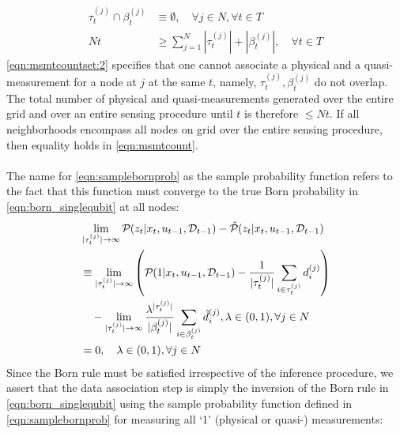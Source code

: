 \begin{align}
\tau^{(j)}_t \cap \beta^{(j)}_t & \equiv \emptyset , \quad\forall j \in N, \forall t \in T \label{eqn:msmtcountset:2} \\
Nt & \geq \sum_{j=1}^{N} |\tau^{(j)}_t| + |\beta^{(j)}_t| , \quad \forall t \in T \label{eqn:msmtcount} 
\end{align} \cref{eqn:msmtcountset:2}  specifies that one cannot associate a physical and a quasi-measurement for a node at $j$ at the same $t$, namely,  $\tau^{(j)}_t, \beta^{(j)}_t$ do not overlap. The total number of physical and quasi-measurements generated over the entire grid and over an entire sensing procedure until $t$ is therefore $\leq Nt$. If all neighborhoods encompass all nodes on grid over the entire sensing procedure, then equality holds in \cref{eqn:msmtcount}. \\
\\
The name for \cref{eqn:samplebornprob} as the sample probability function refers to the fact that this function must converge to the true Born probability in \cref{eqn:born_singlequbit} at all nodes: 
\begin{align}
&\lim_{|\tau^{(j)}_t| \to \infty}  \mathcal{P}_{} ( z_t | x_t, u_{t-1}, \mathcal{D}_{t-1} ) - \hat{\mathcal{P}}_{} (z_t | x_t, u_{t-1}, \mathcal{D}_{t-1}) \\
& \equiv \lim_{|\tau^{(j)}_t| \to \infty} \left( \mathcal{P}_{} ( 1 | x_t, u_{t-1}, \mathcal{D}_{t-1} )  -  \frac{1}{|\tau^{(j)}_t|}\sum_{i \in \tau^{(j)}_t} d^{( j )}_{i} \right) \nonumber \\
&\quad  -  \lim_{|\tau^{(j)}_t| \to \infty}  \frac{\lambda^{|\tau^{(j)}_t|}}{|\beta^{(j)}_t|}\sum_{i \in \beta^{(j)}_t } \hat{d}^{( j )}_{i}, \lambda \in (0,1),  \forall j \in N \\
& =  0, \quad   \lambda \in (0,1),  \forall j \in N
\end{align}  Since the Born rule must be satisfied irrespective of the inference procedure, we assert that the data association step is simply the inversion of the Born rule in \cref{eqn:born_singlequbit} using the sample probability function defined in \cref{eqn:samplebornprob} for measuring all `1' (physical or quasi-) measurements:
